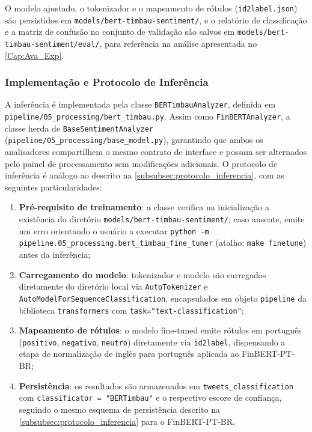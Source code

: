 O modelo ajustado, o tokenizador e o mapeamento de rótulos (\texttt{id2label.json}) são persistidos em \texttt{models/bert-timbau-sentiment/}, e o relatório de classificação e a matriz de confusão no conjunto de validação são salvos em \texttt{models/bert-timbau-sentiment/eval/}, para referência na análise apresentada no \autoref{Cap:Ava_Exp}.

\subsubsection{Implementação e Protocolo de Inferência}
\label{subsubsec:protocolo_inferencia_bertimbau}

A inferência é implementada pela classe \texttt{BERTimbauAnalyzer}, definida em \texttt{pipeline/05\_processing/bert\_timbau.py}. Assim como \texttt{FinBERTAnalyzer}, a classe herda de \texttt{BaseSentimentAnalyzer} (\texttt{pipeline/05\_processing/base\_model.py}), garantindo que ambos os analisadores compartilhem o mesmo contrato de interface e possam ser alternados pelo painel de processamento sem modificações adicionais. O protocolo de inferência é análogo ao descrito na \autoref{subsubsec:protocolo_inferencia}, com as seguintes particularidades:

\begin{enumerate}
	\item \textbf{Pré-requisito de treinamento}: a classe verifica na inicialização a existência do diretório \texttt{models/bert-timbau-sentiment/}; caso ausente, emite um erro orientando o usuário a executar \texttt{python -m pipeline.05\_processing.bert\_timbau\_fine\_tuner} (atalho: \texttt{make finetune}) antes da inferência;
	
	\item \textbf{Carregamento do modelo}: tokenizador e modelo são carregados diretamente do diretório local via \texttt{AutoTokenizer} e \texttt{AutoModelForSequenceClassification}, encapsulados em objeto \texttt{pipeline} da biblioteca \texttt{transformers} com \texttt{task="text-classification"};
	
	\item \textbf{Mapeamento de rótulos}: o modelo fine-tuned emite rótulos em português (\texttt{positivo}, \texttt{negativo}, \texttt{neutro}) diretamente via \texttt{id2label}, dispensando a etapa de normalização de inglês para português aplicada ao FinBERT-PT-BR;
	
	\item \textbf{Persistência}: os resultados são armazenados em \texttt{tweets\_classification} com \texttt{classificator = "BERTimbau"} e o respectivo escore de confiança, seguindo o mesmo esquema de persistência descrito na \autoref{subsubsec:protocolo_inferencia} para o FinBERT-PT-BR.
\end{enumerate}


